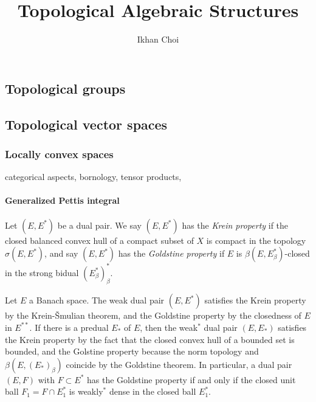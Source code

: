 \documentclass{../../large}
\begin{document}
\title{Topological Algebraic Structures}
\author{Ikhan Choi}
\maketitle
\tableofcontents

\part{}



\chapter{Topological groups}

\chapter{Topological vector spaces}
\section{Locally convex spaces}
categorical aspects,
bornology,
tensor products,




\subsection*{Generalized Pettis integral}

\begin{prb}
Let $(E,E^*)$ be a dual pair.
We say $(E,E^*)$ has the \emph{Krein property} if the closed balanced convex hull of a compact subset of $X$ is compact in the topology $\sigma(E,E^*)$, and say $(E,E^*)$ has the \emph{Goldstine property} if $E$ is $\beta(E,E^*_\beta)$-closed in the strong bidual $(E^*_\beta)^*_\beta$.

Let $E$ a Banach space.
The weak dual pair $(E,E^*)$ satisfies the Krein property by the Krein-\v Smulian theorem, and the Goldstine property by the closedness of $E$ in $E^{**}$.
If there is a predual $E_*$ of $E$, then the weak$^*$ dual pair $(E,E_*)$ satisfies the Krein property by the fact that the closed convex hull of a bounded set is bounded, and the Golstine property because the norm topology and $\beta(E,(E_*)_\beta)$ coincide by the Goldstine theorem.
In particular, a dual pair $(E,F)$ with $F\subset E^*$ has the Goldstine property if and only if the closed unit ball $F_1=F\cap E^*_1$ is weakly$^*$ dense in the closed ball $E^*_1$.
\end{prb}
\end{document}
